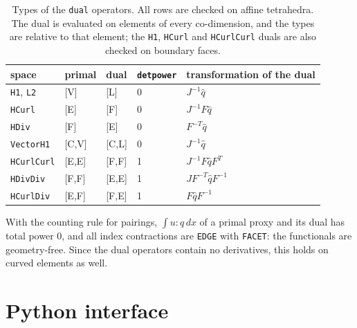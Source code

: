 \documentclass[10pt,a4paper]{article}
\newcommand{\code}[1]{\texttt{#1}}
\newcommand{\VV}{\textsf{V}}
\newcommand{\EE}{\textsf{E}}
\newcommand{\FF}{\textsf{F}}
\newcommand{\LL}{\textsf{L}}
\newcommand{\CC}{\textsf{C}}
\begin{document}
\begin{table}[h]\centering\small
\begin{tabular}{@{}lllll@{}}\toprule
space & primal & dual & \code{detpower} & transformation of the dual \\\midrule
\code{H1}, \code{L2} & [\VV] & [\LL] & 0 & $J^{-1}\hat q$ \\
\code{HCurl} & [\EE] & [\FF] & 0 & $J^{-1}F\hat q$ \\
\code{HDiv} & [\FF] & [\EE] & 0 & $F^{-T}\hat q$ \\
\code{VectorH1} & [\CC,\VV] & [\CC,\LL] & 0 & $J^{-1}\hat q$ \\
\code{HCurlCurl} & [\EE,\EE] & [\FF,\FF] & 1 & $J^{-1} F \hat q F^T$ \\
\code{HDivDiv} & [\FF,\FF] & [\EE,\EE] & 1 & $J F^{-T} \hat q F^{-1}$ \\
\code{HCurlDiv} & [\EE,\FF] & [\FF,\EE] & 1 & $F \hat q F^{-1}$ \\\bottomrule
\end{tabular}
\caption{Types of the \code{dual} operators. All rows are checked on affine tetrahedra. The dual is evaluated on elements of every co-dimension, and the types are relative to that element; the \code{H1}, \code{HCurl} and \code{HCurlCurl} duals are also checked on boundary faces.}\label{tab:dual}
\end{table}

With the counting rule for pairings, $\int u : q\,dx$ of a primal proxy and its dual has total power $0$, and all index contractions are \code{EDGE} with \code{FACET}: the functionals are geometry-free. Since the dual operators contain no derivatives, this holds on curved elements as well.

\section{Python interface}
\end{document}
